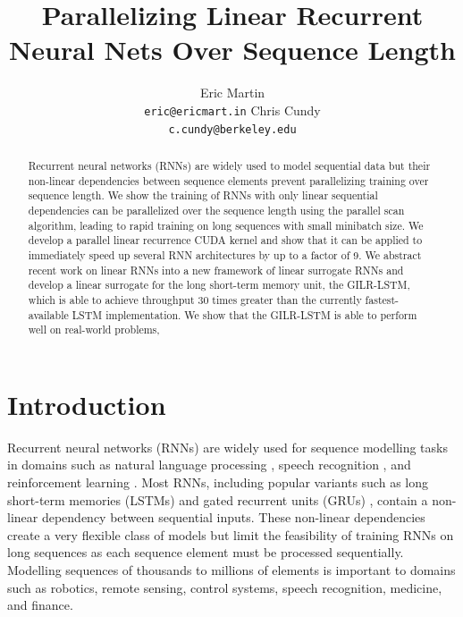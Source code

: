 \documentclass{article}
\title{Parallelizing Linear Recurrent Neural Nets Over Sequence Length}
\author{
  Eric Martin \\%
  \texttt{eric@ericmart.in}
  \And
  Chris Cundy \\
  \texttt{c.cundy@berkeley.edu}
}
\begin{document}

\maketitle

\begin{abstract}
Recurrent neural networks (RNNs) are widely used to model sequential data but
their non-linear dependencies between sequence elements prevent parallelizing
training over sequence length. We show the training of RNNs with only linear
sequential dependencies can be parallelized over the sequence length using the
parallel scan algorithm, leading to rapid training on long sequences with small
minibatch size. We develop a
parallel linear recurrence CUDA kernel and show that it can be applied to
immediately speed up several RNN architectures by up to a factor of 9. We abstract
recent work on linear RNNs into a new framework of linear surrogate RNNs and develop
a linear surrogate for the long short-term memory unit, the GILR-LSTM, which is
able to achieve throughput 30 times greater than the currently fastest-available LSTM
implementation. We show that the GILR-LSTM is able to perform well on real-world
problems, 
\end{abstract}

\section{Introduction}
Recurrent neural networks (RNNs) are widely used for sequence modelling tasks in
domains such as natural language processing \cite{sutskever2014sequence}, speech
recognition \cite{amodei2015deep}, and reinforcement learning
\cite{hausknecht2015deep}. Most RNNs, including popular variants such as long
short-term memories (LSTMs) \cite{hochreiter1997long} and gated recurrent units
(GRUs) \cite{cho2014learning}, contain a non-linear dependency between
sequential inputs. These non-linear dependencies create a very flexible class of
models but limit the feasibility of training RNNs on long sequences as each
sequence element must be processed sequentially.  Modelling sequences of
thousands to millions of elements is important to domains such as robotics,
remote sensing, control systems, speech recognition, medicine, and finance.
\end{document}

